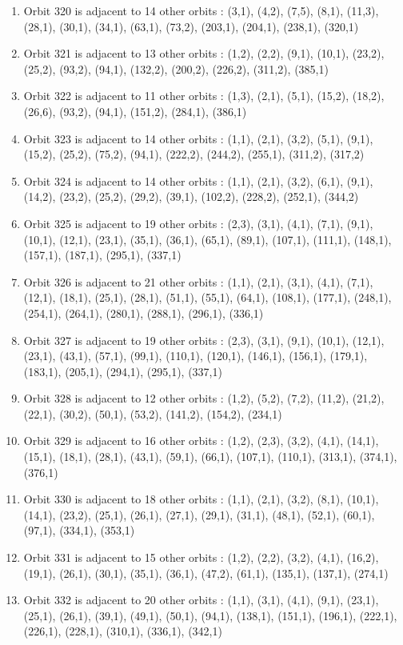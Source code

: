 \documentclass[12pt]{article}
\begin{document}
\begin{enumerate}
\item Orbit 320 is adjacent to 14 other orbits : (3,1), (4,2), (7,5), (8,1), (11,3), (28,1), (30,1), (34,1), (63,1), (73,2), (203,1), (204,1), (238,1), (320,1)
\item Orbit 321 is adjacent to 13 other orbits : (1,2), (2,2), (9,1), (10,1), (23,2), (25,2), (93,2), (94,1), (132,2), (200,2), (226,2), (311,2), (385,1)
\item Orbit 322 is adjacent to 11 other orbits : (1,3), (2,1), (5,1), (15,2), (18,2), (26,6), (93,2), (94,1), (151,2), (284,1), (386,1)
\item Orbit 323 is adjacent to 14 other orbits : (1,1), (2,1), (3,2), (5,1), (9,1), (15,2), (25,2), (75,2), (94,1), (222,2), (244,2), (255,1), (311,2), (317,2)
\item Orbit 324 is adjacent to 14 other orbits : (1,1), (2,1), (3,2), (6,1), (9,1), (14,2), (23,2), (25,2), (29,2), (39,1), (102,2), (228,2), (252,1), (344,2)
\item Orbit 325 is adjacent to 19 other orbits : (2,3), (3,1), (4,1), (7,1), (9,1), (10,1), (12,1), (23,1), (35,1), (36,1), (65,1), (89,1), (107,1), (111,1), (148,1), (157,1), (187,1), (295,1), (337,1)
\item Orbit 326 is adjacent to 21 other orbits : (1,1), (2,1), (3,1), (4,1), (7,1), (12,1), (18,1), (25,1), (28,1), (51,1), (55,1), (64,1), (108,1), (177,1), (248,1), (254,1), (264,1), (280,1), (288,1), (296,1), (336,1)
\item Orbit 327 is adjacent to 19 other orbits : (2,3), (3,1), (9,1), (10,1), (12,1), (23,1), (43,1), (57,1), (99,1), (110,1), (120,1), (146,1), (156,1), (179,1), (183,1), (205,1), (294,1), (295,1), (337,1)
\item Orbit 328 is adjacent to 12 other orbits : (1,2), (5,2), (7,2), (11,2), (21,2), (22,1), (30,2), (50,1), (53,2), (141,2), (154,2), (234,1)
\item Orbit 329 is adjacent to 16 other orbits : (1,2), (2,3), (3,2), (4,1), (14,1), (15,1), (18,1), (28,1), (43,1), (59,1), (66,1), (107,1), (110,1), (313,1), (374,1), (376,1)
\item Orbit 330 is adjacent to 18 other orbits : (1,1), (2,1), (3,2), (8,1), (10,1), (14,1), (23,2), (25,1), (26,1), (27,1), (29,1), (31,1), (48,1), (52,1), (60,1), (97,1), (334,1), (353,1)
\item Orbit 331 is adjacent to 15 other orbits : (1,2), (2,2), (3,2), (4,1), (16,2), (19,1), (26,1), (30,1), (35,1), (36,1), (47,2), (61,1), (135,1), (137,1), (274,1)
\item Orbit 332 is adjacent to 20 other orbits : (1,1), (3,1), (4,1), (9,1), (23,1), (25,1), (26,1), (39,1), (49,1), (50,1), (94,1), (138,1), (151,1), (196,1), (222,1), (226,1), (228,1), (310,1), (336,1), (342,1)

\end{enumerate}
\end{document}
